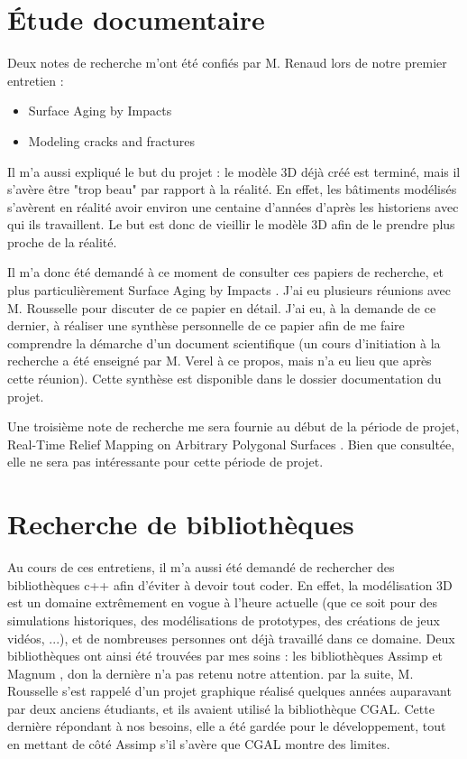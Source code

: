 \documentclass[a4paper,french]{report}
\begin{document}
		\section{Étude documentaire}
			Deux notes de recherche m'ont été confiés par M. Renaud lors de notre premier entretien : 
				\begin{itemize}
					\item Surface Aging by Impacts \cite{PPD01}
					\item Modeling cracks and fractures \cite{Liris-6004}
				\end{itemize}\par
			Il m'a aussi expliqué le but du projet : le modèle 3D déjà créé est terminé, mais il s'avère être "trop beau" par rapport à la réalité. En effet, les bâtiments modélisés s'avèrent en réalité avoir environ une centaine d'années d'après les historiens avec qui ils travaillent. Le but est donc de vieillir le modèle 3D afin de le prendre plus proche de la réalité. \par
			Il m'a donc été demandé à ce moment de consulter ces papiers de recherche, et plus particulièrement Surface Aging by Impacts \cite{PPD01}. J'ai eu plusieurs réunions avec M. Rousselle pour discuter de ce papier en détail. J'ai eu, à la demande de ce dernier, à réaliser une synthèse personnelle de ce papier afin de me faire comprendre la démarche d'un document scientifique (un cours d'initiation à la recherche a été enseigné par M. Verel à ce propos, mais n'a eu lieu que après cette réunion). Cette synthèse est disponible dans le dossier documentation du projet. \par
			Une troisième note de recherche me sera fournie au début de la période de projet, Real-Time Relief Mapping on Arbitrary Polygonal Surfaces \cite{Policarpo:2005:RRM:1053427.1053453}. Bien que consultée, elle ne sera pas intéressante pour cette période de projet.
			
		\section{Recherche de bibliothèques}
			Au cours de ces entretiens, il m'a aussi été demandé de rechercher des bibliothèques c++ afin d'éviter à devoir tout coder. En effet, la modélisation 3D est un domaine extrêmement en vogue à l'heure actuelle (que ce soit pour des simulations historiques, des modélisations de prototypes, des créations de jeux vidéos, ...), et de nombreuses personnes ont déjà travaillé dans ce domaine. Deux bibliothèques ont ainsi été trouvées par mes soins : les bibliothèques Assimp \cite{ASMP} et Magnum \cite{MAGN}, don la dernière n'a pas retenu notre attention. par la suite, M. Rousselle s'est rappelé d'un projet graphique réalisé quelques années auparavant par deux anciens étudiants, et ils avaient utilisé la bibliothèque CGAL. Cette dernière répondant à nos besoins, elle a été gardée pour le développement, tout en mettant de côté Assimp s'il s'avère que CGAL montre des limites. 
		
\end{document}
